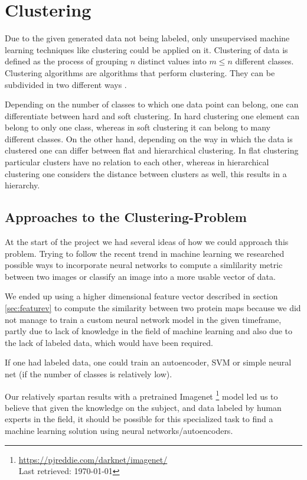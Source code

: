 \documentclass[journal]{vgtc}       %
\newcommand{\todo}[1]{\textcolor{red}{\textbf{TODO:} #1}}
\begin{document}
\section{Clustering}

Due to the given generated data  not being  labeled, only unsupervised machine learning techniques like clustering could be applied on it. 
Clustering of data is defined as the process of grouping $n$ distinct values into $m \leq n$ different classes. Clustering algorithms are algorithms that perform clustering. They can be subdivided in two different ways \cite{iir}.

Depending on the number of classes to which one data point can belong, one can differentiate  between hard and soft clustering. In hard clustering one element can belong to only one class, whereas in soft clustering it can belong to many different classes.
On the other hand, depending on the way in which the data is clustered one can differ between flat and hierarchical clustering. In flat clustering particular clusters have no relation to each other, whereas in hierarchical clustering one considers the distance between clusters as well, this results in a hierarchy.


\subsection{Approaches to the Clustering-Problem}

At the start of the project we had several ideas of how we could approach this problem. 
Trying to follow the recent trend in machine learning we researched possible ways to incorporate neural networks to compute a simlilarity metric between  two images or classify an image into a more usable vector of data.

We ended up using a higher dimensional feature vector described in section \ref{sec:featurev} to  compute the similarity between two protein maps because we did not manage to train a custom neural network model in the given timeframe, partly due to lack of knowledge in the field of machine learning and also due to the lack of labeled data, which would have been required.

If one had labeled data, one could train an autoencoder, SVM or simple neural net (if the number of classes is relatively low).

Our relatively spartan results with a pretrained Imagenet \cite{imagenet}\footnote{\url{https://pjreddie.com/darknet/imagenet/} \\ Last retrieved: \today}  model led us to believe that given the knowledge on the subject, and  data labeled by human experts in the field, it should be possible for this specialized task to find a machine learning  solution using neural networks/autoencoders.
\end{document}

